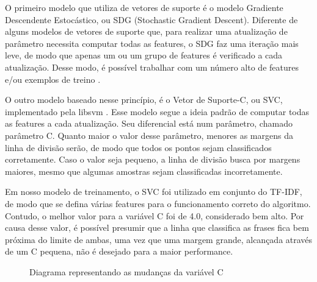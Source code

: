 O primeiro modelo que utiliza de vetores de suporte é o modelo Gradiente Descendente Estocástico, ou SDG (Stochastic Gradient Descent). Diferente de alguns modelos de vetores de suporte que, para realizar uma atualização de parâmetro necessita computar todas as features, o SDG faz uma iteração mais leve, de modo que apenas um ou um grupo de features é verificado a cada atualização. Desse modo, é possível trabalhar com um número alto de features e/ou exemplos de treino \cite{scikit-learn}.

O outro modelo baseado nesse princípio, é o Vetor de Suporte-C, ou SVC, implementado pela libsvm \cite{libsvm}. Esse modelo segue a ideia padrão de computar todas as features a cada atualização. Seu diferencial está num parâmetro, chamado parâmetro C. Quanto maior o valor desse parâmetro, menores as margens da linha de divisão serão, de modo que todos os pontos sejam classificados corretamente. Caso o valor seja pequeno, a linha de divisão busca por margens maiores, mesmo que algumas amostras sejam classificadas incorretamente.

Em nosso modelo de treinamento, o SVC foi utilizado em conjunto do TF-IDF, de modo que se defina várias features para o funcionamento correto do algoritmo. Contudo, o melhor valor para a variável C foi de 4.0, considerado bem alto. Por causa desse valor, é possível presumir que a linha que classifica as frases fica bem próxima do limite de ambas, uma vez que uma margem grande, alcançada através de um C pequena, não é desejado para a maior performance.

\begin{figure}[!htb]
    \caption{\label{fig:svm_example2} Diagrama representando as mudanças da variável C}
\end{figure}

